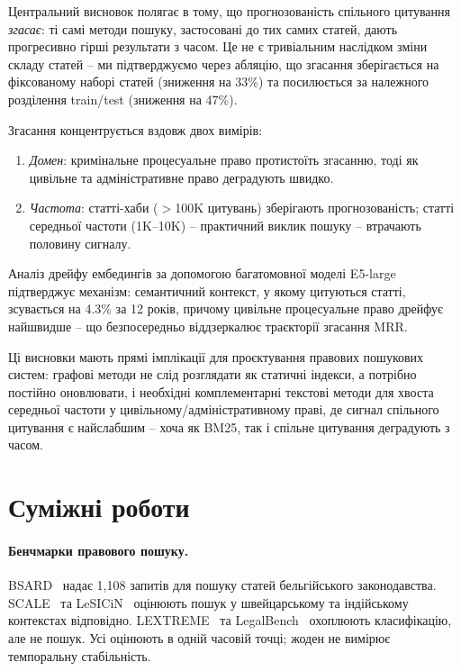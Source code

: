 \documentclass[11pt]{article}
\begin{document}
Центральний висновок полягає в тому, що прогнозованість спільного цитування \emph{згасає}: ті самі методи пошуку, застосовані до тих самих статей, дають прогресивно гірші результати з часом.
Це не є тривіальним наслідком зміни складу статей – ми підтверджуємо через абляцію, що згасання зберігається на фіксованому наборі статей (зниження на 33\%) та посилюється за належного розділення train/test (зниження на 47\%).

Згасання концентрується вздовж двох вимірів:
\begin{enumerate}[nosep,leftmargin=*]
  \item \emph{Домен}: кримінальне процесуальне право протистоїть згасанню, тоді як цивільне та адміністративне право деградують швидко.
  \item \emph{Частота}: статті-хаби ($>$100K цитувань) зберігають прогнозованість; статті середньої частоти (1K–10K) – практичний виклик пошуку – втрачають половину сигналу.
\end{enumerate}

Аналіз дрейфу ембедингів за допомогою багатомовної моделі E5-large підтверджує механізм: семантичний контекст, у якому цитуються статті, зсувається на 4.3\% за 12 років, причому цивільне процесуальне право дрейфує найшвидше – що безпосередньо віддзеркалює траєкторії згасання MRR.

Ці висновки мають прямі імплікації для проєктування правових пошукових систем: графові методи не слід розглядати як статичні індекси, а потрібно постійно оновлювати, і необхідні комплементарні текстові методи для хвоста середньої частоти у цивільному/адміністративному праві, де сигнал спільного цитування є найслабшим – хоча як BM25, так і спільне цитування деградують з часом.

\section{Суміжні роботи}
\label{sec:related}

\paragraph{Бенчмарки правового пошуку.}
BSARD~\citep{lotfi2024bsard} надає 1{,}108 запитів для пошуку статей бельгійського законодавства.
SCALE~\citep{rasiah2023scale} та LeSICiN~\citep{paul2021lesicin} оцінюють пошук у швейцарському та індійському контекстах відповідно.
LEXTREME~\citep{niklaus2023lextreme} та LegalBench~\citep{guha2023legalbench} охоплюють класифікацію, але не пошук.
Усі оцінюють в одній часовій точці; жоден не вимірює темпоральну стабільність.
\end{document}
